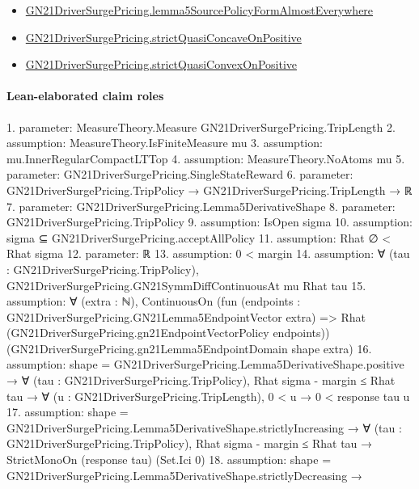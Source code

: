 \documentclass[10pt]{article}
\begin{document}
\begin{itemize}
\item \hyperlink{governing-declaration-0b400bfc6ece079a}{GN21\allowbreak{}Driver\allowbreak{}Surge\allowbreak{}Pricing.\allowbreak{}lemma5\allowbreak{}Source\allowbreak{}Policy\allowbreak{}Form\allowbreak{}Almost\allowbreak{}Everywhere}
\item \hyperlink{governing-declaration-776523ffdc08274c}{GN21\allowbreak{}Driver\allowbreak{}Surge\allowbreak{}Pricing.\allowbreak{}strict\allowbreak{}Quasi\allowbreak{}Concave\allowbreak{}On\allowbreak{}Positive}
\item \hyperlink{governing-declaration-36f2e53a953be3da}{GN21\allowbreak{}Driver\allowbreak{}Surge\allowbreak{}Pricing.\allowbreak{}strict\allowbreak{}Quasi\allowbreak{}Convex\allowbreak{}On\allowbreak{}Positive}
\end{itemize}
\paragraph{Lean-elaborated claim roles}\begin{ReviewVerbatim}
1. parameter: MeasureTheory.Measure GN21DriverSurgePricing.TripLength
2. assumption: MeasureTheory.IsFiniteMeasure mu
3. assumption: mu.InnerRegularCompactLTTop
4. assumption: MeasureTheory.NoAtoms mu
5. parameter: GN21DriverSurgePricing.SingleStateReward
6. parameter: GN21DriverSurgePricing.TripPolicy → GN21DriverSurgePricing.TripLength → ℝ
7. parameter: GN21DriverSurgePricing.Lemma5DerivativeShape
8. parameter: GN21DriverSurgePricing.TripPolicy
9. assumption: IsOpen sigma
10. assumption: sigma ⊆ GN21DriverSurgePricing.acceptAllPolicy
11. assumption: Rhat ∅ < Rhat sigma
12. parameter: ℝ
13. assumption: 0 < margin
14. assumption: ∀ (tau : GN21DriverSurgePricing.TripPolicy), GN21DriverSurgePricing.GN21SymmDiffContinuousAt mu Rhat tau
15. assumption: ∀ (extra : ℕ),
  ContinuousOn
    (fun (endpoints : GN21DriverSurgePricing.GN21Lemma5EndpointVector extra) =>
      Rhat (GN21DriverSurgePricing.gn21EndpointVectorPolicy endpoints))
    (GN21DriverSurgePricing.gn21Lemma5EndpointDomain shape extra)
16. assumption: shape = GN21DriverSurgePricing.Lemma5DerivativeShape.positive →
  ∀ (tau : GN21DriverSurgePricing.TripPolicy),
    Rhat sigma - margin ≤ Rhat tau → ∀ (u : GN21DriverSurgePricing.TripLength), 0 < u → 0 < response tau u
17. assumption: shape = GN21DriverSurgePricing.Lemma5DerivativeShape.strictlyIncreasing →
  ∀ (tau : GN21DriverSurgePricing.TripPolicy), Rhat sigma - margin ≤ Rhat tau → StrictMonoOn (response tau) (Set.Ici 0)
18. assumption: shape = GN21DriverSurgePricing.Lemma5DerivativeShape.strictlyDecreasing →

\end{ReviewVerbatim}
\end{document}
